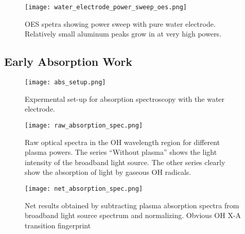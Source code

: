 \begin{figure}[htbp]
  \centering
  \texttt{[image: water\_electrode\_power\_sweep\_oes.png]}
  \caption{OES spetra showing power sweep with pure water electrode. Relatively small aluminum peaks grow in at very high powers.}
  \label{fig:pow_sweep_water}
\end{figure}


\subsection{Early Absorption Work}
\label{sec:absorption}

\begin{figure}[htbp]
  \centering
  \texttt{[image: abs\_setup.png]}
  \caption{Expermental set-up for absorption spectroscopy with the water electrode.}
  \label{fig:expt_abs}
\end{figure}

\begin{figure}[htbp]
  \centering
  \texttt{[image: raw\_absorption\_spec.png]}
  \caption{Raw optical spectra in the OH wavelength region for different plasma powers. The series ``Without plasma'' shows the light intensity of the broadband light source. The other series clearly show the absorption of light by gaseous OH radicals.}
  \label{fig:raw_abs}
\end{figure}

\begin{figure}[htbp]
  \centering
  \texttt{[image: net\_absorption\_spec.png]}
  \caption{Net results obtained by subtracting plasma absorption spectra from broadband light source spectrum and normalizing. Obvious OH X-A transition fingerprint}
  \label{fig:net_abs}
\end{figure}

